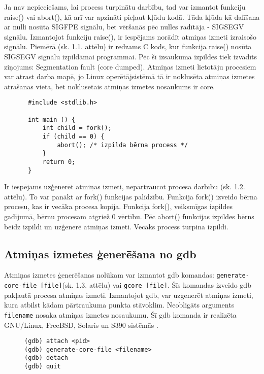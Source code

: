 Ja nav nepieciešams, lai process turpinātu darbību, tad var izmantot funkciju raise() vai abort(), kā arī var apzināti pieļaut kļūdu kodā.
Tāda kļūda kā dalīšana ar nulli nosūta SIGFPE signālu, bet vēršanās pēc nulles radītāja - SIGSEGV signālu.
Izmantojot funkciju raise(), ir iespējams norādīt atmiņas izmeti izraisošo signālu.
Piemērā (sk. 1.1. attēlu) ir redzams C kods, kur funkcija raise() nosūta SIGSEGV signālu izpildāmai programmai. 
Pēc šī izsaukuma izpildes tiek izvadīts ziņojums: Segmentation fault (core dumped).
Atmiņas izmeti lietotāju procesiem var atrast darba mapē, jo Linux operētājsistēmā tā ir noklusēta atmiņas izmetes atrašanas vieta, bet noklusētais atmiņas izmetes nosaukums ir core.
\begin{figure}[h]
\begin{lstlisting}
 #include <stdlib.h>

 int main () {
     int child = fork();
     if (child == 0) {
         abort(); /* izpilda bērna process */
     }
     return 0;
 }
 \end{lstlisting}
\caption{\textbf{\fontsize{11}{12}\selectfont {Atmiņas izmetes ģenerēšana, turpinot procesa darbību}}}
\end{figure}

Ir iespējams uzģenerēt atmiņas izmeti, nepārtraucot procesa darbību (sk. 1.2. attēlu). 
To var panākt ar fork() funkcijas palīdzību. Funkcija fork() izveido bērna procesu, kas ir vecāka procesa kopija.
Funkcija fork(), veiksmīgas izpildes gadījumā, bērnu procesam atgriež 0 vērtību. 
Pēc abort() funkcijas izpildes bērns beidz izpildi un uzģenerē atmiņas izmeti. Vecāks process turpina izpildi.

\subsection{Atmiņas izmetes ģenerēšana no gdb}

Atmiņas izmetes ģenerēšanas nolūkam var izmantot gdb komandas: \texttt{generate-core-file [file]}(sk. 1.3. attēlu) vai \texttt{gcore [file]}. Šīs komandas izveido gdb pakļautā procesa atmiņas izmeti. 
Izmantojot gdb, var uzģenerēt atmiņas izmeti, kura atbilst kādam pārtraukuma punkta stāvoklim. 
Neobligāts arguments \texttt{filename} nosaka atmiņas izmetes nosaukumu. Šī gdb komanda ir realizēta GNU/Linux, FreeBSD, Solaris un S390 sistēmās \cite {core}.
\begin{figure}[h]
\begin{lstlisting}[style=customgdb]
(gdb) attach <pid>
(gdb) generate-core-file <filename>
(gdb) detach
(gdb) quit
 \end{lstlisting}
\caption{\textbf{\fontsize{11}{12}\selectfont {Atmiņas izmetes ģenerēšana, izmantojot gdb}}}
\end{figure}

